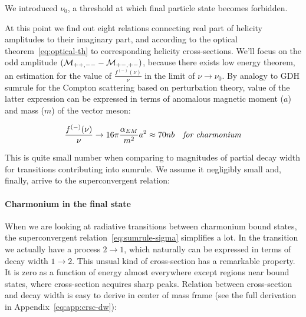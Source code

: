We introduced $\nu_0$, a threshold at which final particle state becomes forbidden.

At this point we find out eight relations connecting real part of helicity amplitudes to their imaginary part, and according to the optical theorem~\cref{eq:optical-th} to corresponding helicity cross-sections. We'll focus on the odd amplitude $(\mathcal{M}_{++,--} - \mathcal{M}_{+-,+-})$, because there exists low energy theorem, an estimation for the value of $\frac{f^{(-)}(\nu)}{\nu}$ in the limit of $\nu \rightarrow \nu_0$. By analogy to GDH sumrule for the Compton scattering based on perturbation theory, value of the latter expression can be expressed in terms of anomalous magnetic moment ($a$) and mass ($m$) of the vector meson:

\begin{align}
    \frac{f^{(-)}(\nu)}{\nu} \rightarrow 16 \pi \frac{\alpha_{EM}}{m^2} a^2 \approx 70 nb \text{\quad \textit{for charmonium}}
\end{align}

This is quite small number when comparing to magnitudes of partial decay width for transitions contributing into sumrule. We assume it negligibly small and, finally, arrive to the superconvergent relation:

\begin{center}  \end{center}

\paragraph{Charmonium in the final state}
When we are looking at radiative transitions between charmonium bound states, the superconvergent relation~\cref{eq:sumrule-sigma} simplifies a lot. In the transition we actually have a process $2 \rightarrow 1$, which naturally can be expressed in terms of decay width $1 \rightarrow 2$. This unsual kind of cross-section has a remarkable property. It is zero as a function of energy almost everywhere except regions near bound states, where cross-section acquires sharp peaks. Relation between cross-section and decay width is easy to derive in center of mass frame (see the full derivation in Appendix~\cref{eq:app:crsc-dw}):

